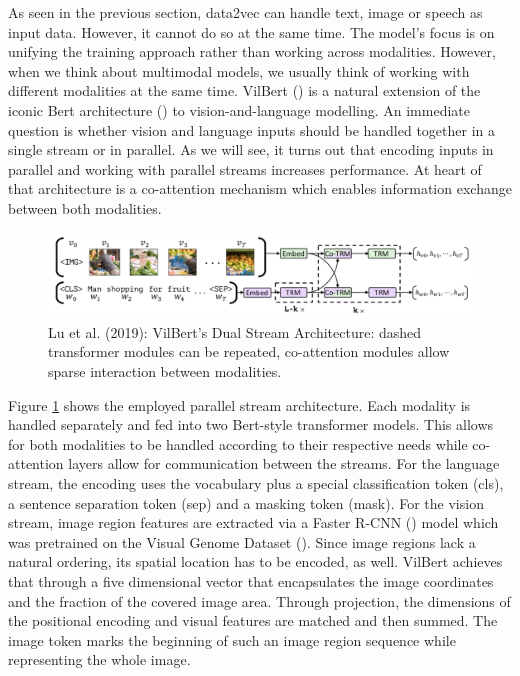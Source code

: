 \documentclass[
]{krantz}
\begin{document}
As seen in the previous section, data2vec can handle text, image or speech as input data. However, it cannot do so at the same time. The model's focus is on unifying the training approach rather than working across modalities.
However, when we think about multimodal models, we usually think of working with different modalities at the same time. VilBert (\citet{lu2019vilbert}) is a natural extension of the iconic Bert architecture (\citet{devlin2018bert}) to vision-and-language modelling. An immediate question is whether vision and language inputs should be handled together in a single stream or in parallel. As we will see, it turns out that encoding inputs in parallel and working with parallel streams increases performance.
At heart of that architecture is a co-attention mechanism which enables information exchange between both modalities.

\begin{figure}

{\centering \includegraphics[width=1\linewidth]{figures/05-chapter2/vilbertarc} 

}

\caption{Lu et al. (2019): VilBert's Dual Stream Architecture: dashed transformer modules can be repeated, co-attention modules allow sparse interaction between modalities.}\label{fig:vilbertarc}
\end{figure}

Figure \ref{fig:vilbertarc} shows the employed parallel stream architecture.
Each modality is handled separately and fed into two Bert-style transformer models. This allows for both modalities to be handled according to their respective needs while co-attention layers allow for communication between the streams. For the language stream, the encoding uses the vocabulary plus a special classification token (cls), a sentence separation token (sep) and a masking token (mask). For the vision stream, image region features are extracted via a Faster R-CNN (\citet{ren2015faster}) model which was pretrained on the Visual Genome Dataset (\citet{krishnavisualgenome}). Since image regions lack a natural ordering, its spatial location has to be encoded, as well. VilBert achieves that through a five dimensional vector that encapsulates the image coordinates and the fraction of the covered image area. Through projection, the dimensions of the positional encoding and visual features are matched and then summed. The image token marks the beginning of such an image region sequence while representing the whole image.
\end{document}
